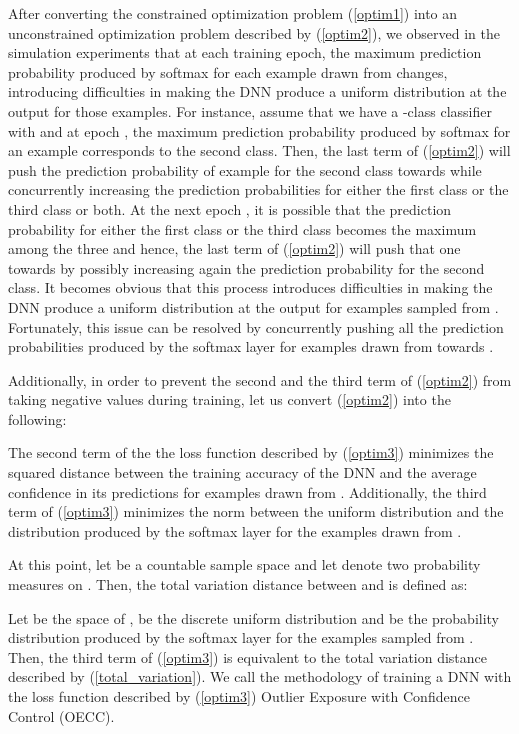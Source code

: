 \documentclass{article} \usepackage{iclr2020_conference,times}
\begin{document}
After converting the constrained optimization problem (\ref{optim1}) into an unconstrained optimization problem described by (\ref{optim2}), we observed in the simulation experiments that at each training epoch, the maximum prediction probability produced by softmax for each example drawn from  changes, introducing difficulties in making the DNN produce a uniform distribution at the output for those examples. For instance, assume that we have a -class classifier with  and at epoch , the maximum prediction probability produced by softmax for an example  corresponds to the second class. Then, the last term of (\ref{optim2}) will push the prediction probability of example  for the second class towards  while concurrently increasing the prediction probabilities for either the first class or the third class or both. At the next epoch , it is possible that the prediction probability for either the first class or the third class becomes the maximum among the three and hence, the last term of (\ref{optim2}) will push that one towards  by possibly increasing again the prediction probability for the second class. It becomes obvious that this process introduces difficulties in making the DNN produce a uniform distribution at the output for examples sampled from . Fortunately, this issue can be resolved by concurrently pushing all the prediction probabilities produced by the softmax layer for examples drawn from  towards .    

Additionally, in order to prevent the second and the third term of (\ref{optim2}) from taking negative values during training, let us convert (\ref{optim2}) into the following:  


The second term of the the loss function described by (\ref{optim3}) minimizes the squared distance between the training accuracy of the DNN and the average confidence in its predictions for examples drawn from . Additionally, the third term of (\ref{optim3}) minimizes the  norm between the uniform distribution and the distribution produced by the softmax layer for the examples drawn from . 

At this point, let  be a countable sample space and let  denote two probability measures on . Then, the total variation distance between  and  is defined as: 

Let  be the space of ,  be the discrete uniform distribution and  be the probability distribution produced by the softmax layer for the examples sampled from . Then, the third term of (\ref{optim3}) is equivalent to the total variation distance described by (\ref{total_variation}). We call the methodology of training a DNN with the loss function described by (\ref{optim3}) Outlier Exposure with Confidence Control (OECC).
\end{document}
